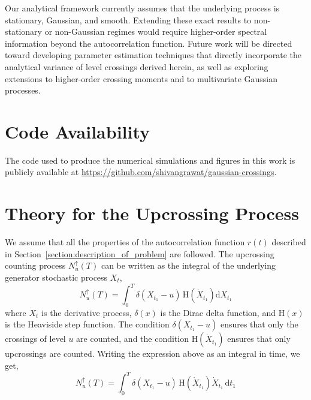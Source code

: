 \documentclass[journal]{IEEEtran}
\theoremstyle{plain}
\theoremstyle{definition}
\theoremstyle{remark}
\newcommand{\Nup}{N_u^{\uparrow}(T)}
\newcommand{\dd}{\mathrm{d}}
\begin{document}
Our analytical framework currently assumes that the underlying process is stationary, Gaussian, and smooth.
Extending these exact results to non-stationary or non-Gaussian regimes would require higher-order spectral information beyond the autocorrelation function.
Future work will be directed toward developing parameter estimation techniques that directly incorporate the analytical variance of level crossings derived herein, as well as exploring extensions to higher-order crossing moments and to multivariate Gaussian processes.

\section*{Code Availability}
The code used to produce the numerical simulations and figures in this work is publicly available at \url{https://github.com/shivangrawat/gaussian-crossings}.




\clearpage
\onecolumn

\appendices
{}
\allowdisplaybreaks

\section{Theory for the Upcrossing Process} 
\label{section:known_theory}
We assume that all the properties of the autocorrelation function $r(t)$ described in Section~\ref{section:description_of_problem} are followed. The upcrossing counting process $\Nup$ can be written as the integral of the underlying generator stochastic process $X_t$,
\begin{equation}
    \Nup = \int_0^T \delta\left(X_{t_1} - u\right) \, \mathrm{H}\left(\dot{X}_{t_1}\right) \dd X_{t_1}
\end{equation}
where $\dot{X}_t$ is the derivative process, $\delta(x)$ is the Dirac delta function, and $\mathrm{H}(x)$ is the Heaviside step function. The condition $\delta\left(X_{t_1} - u\right)$ ensures that only the crossings of level $u$ are counted, and the condition $\mathrm{H}(\dot{X}_{t_1})$ ensures that only upcrossings are counted. Writing the expression above as an integral in time, we get,
\begin{equation}
    \Nup = \int_0^T \delta\left(X_{t_1} - u\right) \, \mathrm{H}\left(\dot{X}_{t_1}\right) \dot{X}_{t_1} \, \dd t_1 \label{eq:defn_Nu_delta}
\end{equation} 
\end{document}
